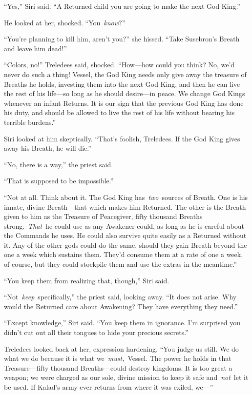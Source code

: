 “Yes,” Siri said. “A Returned child you are going to make the next God King.”

He looked at her, shocked. “You~\textit{know}?”

“You’re planning to kill him, aren’t you?” she hissed. “Take Susebron’s Breath and leave him dead!”

“Colors, no!” Treledees said, shocked. “How—how could you think? No, we’d never do such a thing! Vessel, the God King needs only give away the treasure of Breaths he holds, investing them into the next God King, and then he can live the rest of his life—so long as he should desire—in peace. We change God Kings whenever an infant Returns. It is our sign that the previous God King has done his duty, and should be allowed to live the rest of his life without bearing his terrible burdens.”

Siri looked at him skeptically. “That’s foolish, Treledees. If the God King gives away his Breath, he will die.”

“No, there is a way,” the priest said.

“That is supposed to be impossible.”

“Not at all. Think about it. The God King has~\textit{two}~sources of Breath. One is his innate, divine Breath—that which makes him Returned. The other is the Breath given to him as the Treasure of Peacegiver, fifty thousand Breaths strong.~\textit{That}~he could use as any Awakener could, as long as he is careful about the Commands he uses. He could also survive quite easily as a Returned without it. Any of the other gods could do the same, should they gain Breath beyond the one a week which sustains them. They’d consume them at a rate of one a week, of course, but they could stockpile them and use the extras in the meantime.”

“You keep them from realizing that, though,” Siri said.

“Not~\textit{keep}~specifically,” the priest said, looking away. “It does not arise. Why would the Returned care about Awakening? They have everything they need.”

“Except knowledge,” Siri said. “You keep them in ignorance. I’m surprised you didn’t cut out all their tongues to hide your precious secrets.”

Treledees looked back at her, expression hardening. “You judge us still. We do what we do because it is what we~\textit{must,}~Vessel. The power he holds in that Treasure—fifty thousand Breaths—could destroy kingdoms. It is too great a weapon; we were charged as our sole, divine mission to keep it safe and~\textit{not}~let it be used. If Kalad’s army ever returns from where it was exiled, we—”


